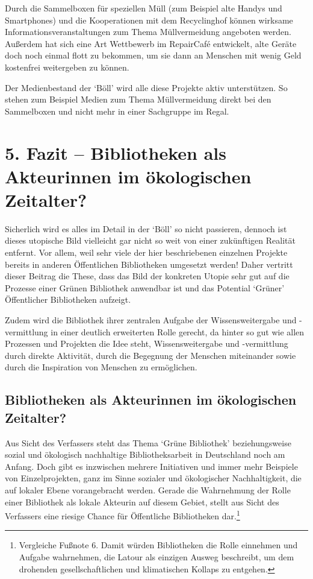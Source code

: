 \documentclass[a4paper,
fontsize=11pt,
oneside,
numbers=noperiodatend,
parskip=half-,
bibliography=totoc,
final
]{scrartcl}
\begin{document}
Durch die Sammelboxen für speziellen Müll (zum Beispiel alte Handys und
Smartphones) und die Kooperationen mit dem Recyclinghof können wirksame
Informationsveranstaltungen zum Thema Müllvermeidung angeboten werden.
Außerdem hat sich eine Art Wettbewerb im RepairCafé entwickelt, alte
Geräte doch noch einmal flott zu bekommen, um sie dann an Menschen mit
wenig Geld kostenfrei weitergeben zu können.

Der Medienbestand der \enquote*{Böll} wird alle diese Projekte aktiv
unterstützen. So stehen zum Beispiel Medien zum Thema Müllvermeidung
direkt bei den Sammelboxen und nicht mehr in einer Sachgruppe im Regal.

\hypertarget{fazit-bibliotheken-als-akteurinnen-im-uxf6kologischen-zeitalter}{%
\section{5. Fazit -- Bibliotheken als Akteurinnen im ökologischen
Zeitalter?}\label{fazit-bibliotheken-als-akteurinnen-im-uxf6kologischen-zeitalter}}

Sicherlich wird es alles im Detail in der \enquote*{Böll} so nicht
passieren, dennoch ist dieses utopische Bild vielleicht gar nicht so
weit von einer zukünftigen Realität entfernt. Vor allem, weil sehr viele
der hier beschriebenen einzelnen Projekte bereits in anderen
Öffentlichen Bibliotheken umgesetzt werden! Daher vertritt dieser
Beitrag die These, dass das Bild der konkreten Utopie sehr gut auf die
Prozesse einer Grünen Bibliothek anwendbar ist und das Potential
\enquote*{Grüner} Öffentlicher Bibliotheken aufzeigt.

Zudem wird die Bibliothek ihrer zentralen Aufgabe der Wissensweitergabe
und -vermittlung in einer deutlich erweiterten Rolle gerecht, da hinter
so gut wie allen Prozessen und Projekten die Idee steht,
Wissensweitergabe und -vermittlung durch direkte Aktivität, durch die
Begegnung der Menschen miteinander sowie durch die Inspiration von
Menschen zu ermöglichen.

\hypertarget{bibliotheken-als-akteurinnen-im-uxf6kologischen-zeitalter}{%
\subsection{Bibliotheken als Akteurinnen im ökologischen
Zeitalter?}\label{bibliotheken-als-akteurinnen-im-uxf6kologischen-zeitalter}}

Aus Sicht des Verfassers steht das Thema \enquote*{Grüne Bibliothek}
beziehungsweise sozial und ökologisch nachhaltige Bibliotheksarbeit in
Deutschland noch am Anfang. Doch gibt es inzwischen mehrere Initiativen
und immer mehr Beispiele von Einzelprojekten, ganz im Sinne sozialer und
ökologischer Nachhaltigkeit, die auf lokaler Ebene vorangebracht werden.
Gerade die Wahrnehmung der Rolle einer Bibliothek als lokale Akteurin
auf diesem Gebiet, stellt aus Sicht des Verfassers eine riesige Chance
für Öffentliche Bibliotheken dar.\footnote{Vergleiche Fußnote 6. Damit
  würden Bibliotheken die Rolle einnehmen und Aufgabe wahrnehmen, die
  Latour als einzigen Ausweg beschreibt, um dem drohenden
  gesellschaftlichen und klimatischen Kollaps zu entgehen.}
\end{document}
